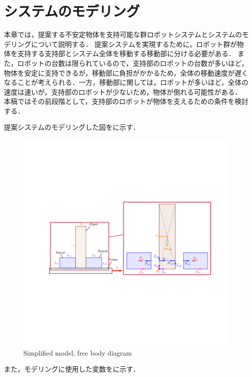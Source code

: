 \section{システムのモデリング}
本章では，提案する不安定物体を支持可能な群ロボットシステムとシステムのモデリングについて説明する．
提案システムを実現するために，ロボット群が物体を支持する支持部とシステム全体を移動する移動部に分ける必要がある．
また，ロボットの台数は限られているので，支持部のロボットの台数が多いほど，物体を安定に支持できるが，移動部に負担がかかるため，全体の移動速度が遅くなることが考えられる．一方，移動部に関しては，ロボットが多いほど，全体の速度は速いが，支持部のロボットが少ないため，物体が倒れる可能性がある．
本稿ではその前段階として，支持部のロボットが物体を支えるための条件を検討する．

提案システムのモデリングした図をに示す．
\begin{figure}[b]
  \centering
  \includegraphics[width=0.9\columnwidth]{figures/modeling.pdf}
  \caption{Simplified model, free body diagram}
  \label{fig:modeling}
\end{figure}
また，モデリングに使用した変数をに示す．
